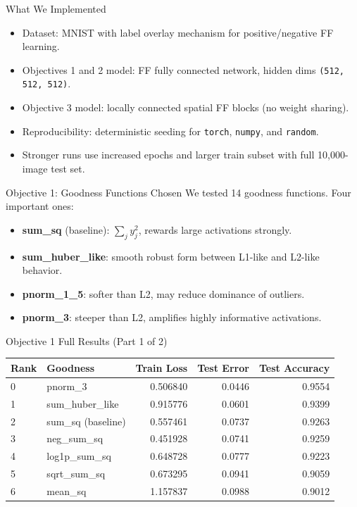 \documentclass[aspectratio=169]{beamer}
\begin{document}
\begin{frame}{What We Implemented}
\begin{itemize}
  \item Dataset: MNIST with label overlay mechanism for positive/negative FF learning.
  \item Objectives 1 and 2 model: FF fully connected network, hidden dims \texttt{(512, 512, 512)}.
  \item Objective 3 model: locally connected spatial FF blocks (no weight sharing).
  \item Reproducibility: deterministic seeding for \texttt{torch}, \texttt{numpy}, and \texttt{random}.
  \item Stronger runs use increased epochs and larger train subset with full 10,000-image test set.
\end{itemize}
\end{frame}

\begin{frame}{Objective 1: Goodness Functions Chosen}
We tested 14 goodness functions. Four important ones:
\begin{itemize}
  \item \textbf{sum\_sq} (baseline): \(\sum_j y_j^2\), rewards large activations strongly.
  \item \textbf{sum\_huber\_like}: smooth robust form between L1-like and L2-like behavior.
  \item \textbf{pnorm\_1\_5}: softer than L2, may reduce dominance of outliers.
  \item \textbf{pnorm\_3}: steeper than L2, amplifies highly informative activations.
\end{itemize}
\end{frame}

\begin{frame}{Objective 1 Full Results (Part 1 of 2)}
\scriptsize
\begin{table}[h]
\centering
\begin{tabular}{l l r r r}
\hline
Rank & Goodness & Train Loss & Test Error & Test Accuracy \\
\hline
0 & pnorm\_3 & 0.506840 & 0.0446 & 0.9554 \\
1 & sum\_huber\_like & 0.915776 & 0.0601 & 0.9399 \\
2 & sum\_sq (baseline) & 0.557461 & 0.0737 & 0.9263 \\
3 & neg\_sum\_sq & 0.451928 & 0.0741 & 0.9259 \\
4 & log1p\_sum\_sq & 0.648728 & 0.0777 & 0.9223 \\
5 & sqrt\_sum\_sq & 0.673295 & 0.0941 & 0.9059 \\
6 & mean\_sq & 1.157837 & 0.0988 & 0.9012 \\
\hline
\end{tabular}
\end{table}
\normalsize
\end{frame}
\end{document}
